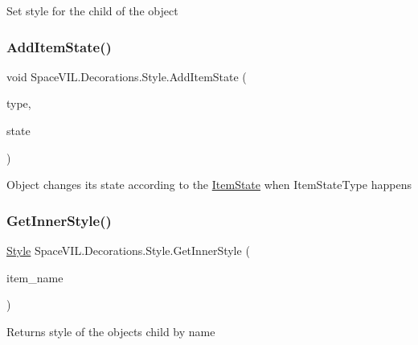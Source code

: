 Set style for the child of the object 

\mbox{\label{class_space_v_i_l_1_1_decorations_1_1_style_a738cd9c81f6a8b10a2a59de982ebdf6d}} 
\subsubsection{\texorpdfstring{Add\+Item\+State()}{AddItemState()}}
{\footnotesize\ttfamily void Space\+V\+I\+L.\+Decorations.\+Style.\+Add\+Item\+State (\begin{DoxyParamCaption}\item[{Item\+State\+Type}]{type,  }\item[{\mbox{\hyperlink{class_space_v_i_l_1_1_decorations_1_1_item_state}{Item\+State}}}]{state }\end{DoxyParamCaption})}



Object changes its state according to the \mbox{\hyperlink{class_space_v_i_l_1_1_decorations_1_1_item_state}{Item\+State}} when Item\+State\+Type happens 

\mbox{\label{class_space_v_i_l_1_1_decorations_1_1_style_ac96f01bb7a62301810a935292a9066f9}} 
\subsubsection{\texorpdfstring{Get\+Inner\+Style()}{GetInnerStyle()}}
{\footnotesize\ttfamily \mbox{\hyperlink{class_space_v_i_l_1_1_decorations_1_1_style}{Style}} Space\+V\+I\+L.\+Decorations.\+Style.\+Get\+Inner\+Style (\begin{DoxyParamCaption}\item[{String}]{item\+\_\+name }\end{DoxyParamCaption})}



Returns style of the object\textquotesingle{}s child by name 

